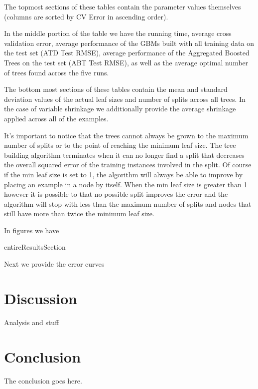 \documentclass[9pt, conference]{IEEEtran}
\begin{document}
The topmost sections of these tables contain the parameter values themselves (columns are sorted by CV Error in ascending order). 

In the middle portion of the table we have the running time, average cross validation error, average performance of the GBMs built with all training data on the test set (ATD Test RMSE), average performance of the Aggregated Boosted Trees on the test set (ABT Test RMSE), as well as the average optimal number of trees found across the five runs. 

The bottom most sections of these tables contain the mean and standard deviation values of the actual leaf sizes and number of splits across all trees. In the case of variable shrinkage we additionally provide the average shrinkage applied across all of the examples. 

It's important to notice that the trees cannot always be grown to the maximum number of splits or to the point of reaching the minimum leaf size. The tree building algorithm terminates when it can no longer find a split that decreases the overall squared error of the training instances involved in the split. Of course if the min leaf size is set to 1, the algorithm will always be able to improve by placing an example in a node by itself. When the min leaf size is greater than 1 however it is possible to that no possible split improves the error and the algorithm will stop with less than the maximum number of splits and nodes that still have more than twice the minimum leaf size.


In figures \todo{} we have

{entireResultsSection}




Next we provide the error curves

\section{Discussion}
Analysis and stuff
\section{Conclusion}
The conclusion goes here.

\newpage




\end{document}
